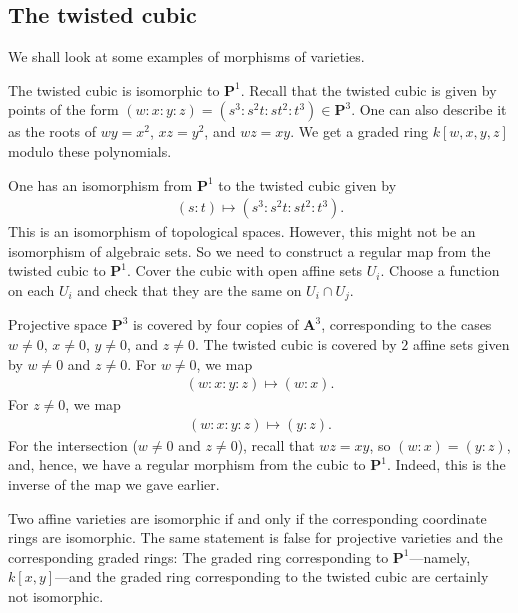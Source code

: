 \documentclass[11pt, oneside,margin=1in]{article}
\begin{document}
\subsection{The twisted cubic}
We shall look at some examples of morphisms of varieties.

\begin{example}\label{}\text{}
The twisted cubic is isomorphic to $\mathbf{P}^1$. Recall that the twisted cubic is given by points of the form $(w:x:y:z) = (s^3:s^2t:st^2:t^3)\in  \mathbf{P}^3$. One can also describe it as the roots of $wy=x^2$, $xz=y^2$, and $wz=xy$. We get a graded ring $k[w,x,y,z]$ modulo these polynomials.

One has an isomorphism from $\mathbf{P}^1$ to the twisted cubic given by 
\begin{align*}
	(s:t) \longmapsto  (s^3:s^2t:st^2:t^3).
\end{align*}
This is an isomorphism of topological spaces. However, this might not be an isomorphism of algebraic sets. So we need to construct a regular map from the twisted cubic to $\mathbf{P}^1$. Cover the cubic with open affine sets $U_i$. Choose a function on each $U_i$ and check that they are the same on $U_i\cap U_j$.

Projective space $\mathbf{P}^3$ is covered by four copies of $\mathbf{A}^3$, corresponding to the cases $w\ne 0$, $x\ne 0$, $y\ne 0$, and $z\ne 0$. The twisted cubic is covered by $2$ affine sets given by $w\ne 0$ and $z\ne 0$. For $w\ne 0$, we map
\begin{align*}
	(w:x:y:z)\longmapsto  (w:x).
\end{align*}
For $z\ne 0$, we map
\begin{align*}
	(w:x:y:z)\longmapsto  (y:z).
\end{align*}
For the intersection ($w\ne 0$ and $z\ne 0$), recall that $wz=xy$, so $(w:x)= (y:z)$, and, hence, we have a regular morphism from the cubic to $\mathbf{P}^1$. Indeed, this is the inverse of the map we gave earlier.
\end{example}

\begin{remark}
	Two affine varieties are isomorphic if and only if the corresponding coordinate rings are isomorphic. The same statement is false for projective varieties and the corresponding graded rings: The graded ring corresponding to $\mathbf{P}^1$---namely, $k[x,y]$---and the graded ring corresponding to the twisted cubic are certainly not isomorphic.
\end{remark}
\end{document}
